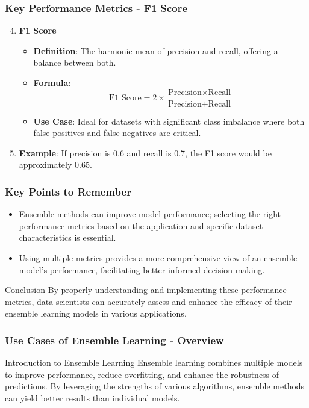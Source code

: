 \documentclass[aspectratio=169]{beamer}
\begin{document}
\begin{frame}[fragile]
    \frametitle{Key Performance Metrics - F1 Score}
    \begin{enumerate}
        \setcounter{enumi}{3}
        \item \textbf{F1 Score}
        \begin{itemize}
            \item \textbf{Definition}: The harmonic mean of precision and recall, offering a balance between both.
            \item \textbf{Formula}:
            \begin{equation}
                \text{F1 Score} = 2 \times \frac{\text{Precision} \times \text{Recall}}{\text{Precision} + \text{Recall}}
            \end{equation}
            \item \textbf{Use Case}: Ideal for datasets with significant class imbalance where both false positives and false negatives are critical.
        \end{itemize}
        \item \textbf{Example}: If precision is 0.6 and recall is 0.7, the F1 score would be approximately 0.65.
    \end{enumerate}
\end{frame}

\begin{frame}[fragile]
    \frametitle{Key Points to Remember}
    \begin{itemize}
        \item Ensemble methods can improve model performance; selecting the right performance metrics based on the application and specific dataset characteristics is essential.
        \item Using multiple metrics provides a more comprehensive view of an ensemble model's performance, facilitating better-informed decision-making.
    \end{itemize}
    \begin{block}{Conclusion}
        By properly understanding and implementing these performance metrics, data scientists can accurately assess and enhance the efficacy of their ensemble learning models in various applications.
    \end{block}
\end{frame}

\begin{frame}[fragile]
  \frametitle{Use Cases of Ensemble Learning - Overview}
  \begin{block}{Introduction to Ensemble Learning}
    Ensemble learning combines multiple models to improve performance, reduce overfitting, and enhance the robustness of predictions.
    By leveraging the strengths of various algorithms, ensemble methods can yield better results than individual models.
  \end{block}
\end{frame}
\end{document}
